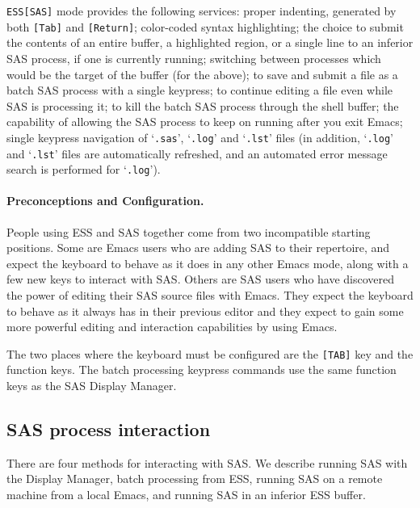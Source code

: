 \documentclass{article}
\newcommand{\stexttt}[1]{{\small\texttt{#1}}}
\newcommand{\file}[1]{`\stexttt{#1}'}
\begin{document}
\stexttt{ESS[SAS]} mode provides the following services: proper indenting, 
generated by both
\stexttt{[Tab]} and \stexttt{[Return]}; color-coded syntax
highlighting; the choice to submit the contents of an entire buffer, a
highlighted region, or a single line to an inferior SAS process, if
one is currently running; switching between processes which
would be the target of the buffer (for the above); to save and
submit a file as a batch SAS process with a single keypress; 
to continue editing a file even while SAS is processing it; to
kill the batch SAS process through the shell buffer;
the capability of allowing the SAS process to keep on running after
you exit Emacs; single keypress navigation of \file{.sas}, \file{.log}
and \file{.lst} files (in addition, \file{.log} and \file{.lst} files are
automatically refreshed, and an automated error message search is performed
for \file{.log}).


\paragraph{Preconceptions and Configuration.}

People using ESS and SAS together come from two incompatible starting
positions.  Some are Emacs users who are adding SAS to their
repertoire, and expect the keyboard to behave as it does in any other
Emacs mode, along with a few new keys to interact with SAS.  Others
are SAS users who have discovered the power of editing their SAS
source files with Emacs.  They expect the keyboard to behave as it
always has in their previous editor and they expect to gain some more
powerful editing and interaction capabilities by using Emacs.

The two places where the keyboard must be configured are the
\texttt{[TAB]} key and the function keys.  The batch processing
keypress commands use the same function keys as the SAS Display
Manager.

\subsection{SAS process interaction}
\label{sec:SAS:proc}

There are four methods for interacting with SAS.  We describe running
SAS with the Display Manager, batch
processing from ESS,  running SAS on a remote machine from
a local Emacs, and running SAS in an inferior ESS buffer.
\end{document}
